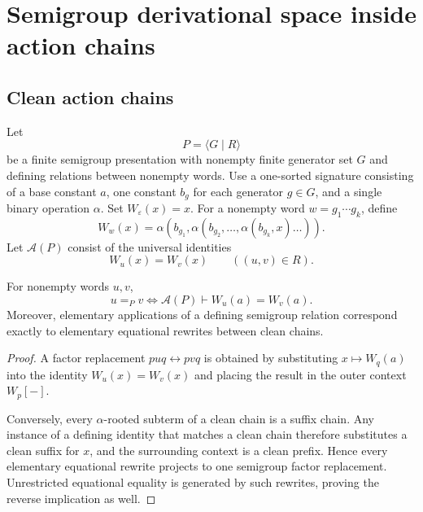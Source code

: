 \section{Semigroup derivational space inside action chains}\label{sec:semigroup}

\subsection{Clean action chains}

Let
\[
P=\langle G\mid R\rangle
\]
be a finite semigroup presentation with nonempty finite generator set $G$ and defining relations between nonempty words.  Use a one-sorted signature consisting of a base constant $a$, one constant $b_g$ for each generator $g\in G$, and a single binary operation $\alpha$.  Set $W_\varepsilon(x)=x$. For a nonempty word $w=g_1\cdots g_k$, define
\begin{equation}
W_w(x)=
\alpha(b_{g_1},
 \alpha(b_{g_2},\ldots,
  \alpha(b_{g_k},x)\ldots)).
\label{eq:wordchain}
\end{equation}
Let $\mathcal A(P)$ consist of the universal identities
\begin{equation}
W_u(x)=W_v(x)
\qquad((u,v)\in R).
\label{eq:actionidentities}
\end{equation}

\begin{theorem}\label{thm:cleanchain}
For nonempty words $u,v$,
\[
\boxed{u=_P v\iff
\mathcal A(P)\vdash W_u(a)=W_v(a).}
\]
Moreover, elementary applications of a defining semigroup relation correspond exactly to elementary equational rewrites between clean chains.
\end{theorem}

\begin{proof}
A factor replacement $puq\leftrightarrow pvq$ is obtained by substituting $x\mapsto W_q(a)$ into the identity $W_u(x)=W_v(x)$ and placing the result in the outer context $W_p[-]$.

Conversely, every $\alpha$-rooted subterm of a clean chain is a suffix chain.  Any instance of a defining identity that matches a clean chain therefore substitutes a clean suffix for $x$, and the surrounding context is a clean prefix.  Hence every elementary equational rewrite projects to one semigroup factor replacement. Unrestricted equational equality is generated by such rewrites, proving the reverse implication as well.
\end{proof}

